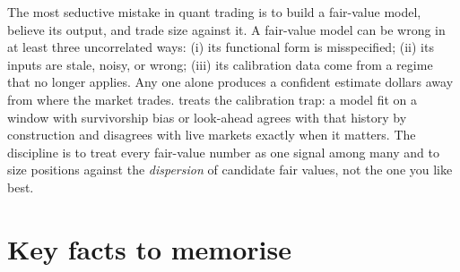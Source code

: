 \begin{pitfallbox}
The most seductive mistake in quant trading is to build a
fair-value model, believe its output, and trade size against it. A
fair-value model can be wrong in at least three uncorrelated ways:
(i) its functional form is misspecified; (ii) its inputs are stale,
noisy, or wrong; (iii) its calibration data come from a regime that
no longer applies. Any one alone produces a confident estimate
dollars away from where the market trades. 
treats the calibration trap: a model fit on a window with
survivorship bias or look-ahead agrees with that history by
construction and disagrees with live markets exactly when it
matters. The discipline is to treat every fair-value number as one
signal among many and to size positions against the
\emph{dispersion} of candidate fair values, not the one you like
best.
\end{pitfallbox}

\section{Key facts to memorise}
\label{sec:ch3_keyfacts}

